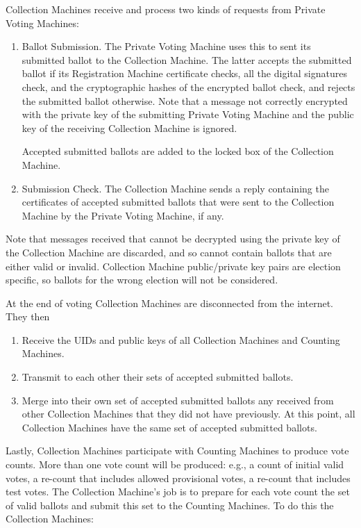 \documentclass[12pt]{article}
\begin{document}
Collection Machines receive and process two kinds of requests from
Private Voting Machines:
\begin{enumerate}

\item
Ballot Submission.  The Private Voting Machine uses this to sent
its submitted ballot to the Collection Machine.  The latter accepts
the submitted ballot if its Registration Machine certificate checks,
all the digital signatures check, and the cryptographic hashes of the
encrypted ballot check, and rejects the submitted
ballot otherwise.  Note that a message not correctly encrypted with
the private key of the submitting Private Voting Machine and the
public key of the receiving Collection Machine is ignored.

Accepted submitted ballots are added to the locked box of the
Collection Machine.

\item
Submission Check.  The Collection Machine sends a reply containing
the certificates of accepted submitted ballots
that were sent to the Collection Machine
by the Private Voting Machine, if any.

\end{enumerate}

Note that messages received that cannot be decrypted using the
private key of the Collection Machine
are discarded, and so cannot contain
ballots that are either valid or invalid.  Collection Machine
public/private key pairs are election specific, so ballots for
the wrong election will not be considered.

At the end of voting Collection Machines are disconnected from
the internet.  They then
\begin{enumerate}
\item Receive the UIDs and public keys of all Collection Machines and
Counting Machines.
\item Transmit to each other their sets of accepted submitted ballots.
\item Merge into their own set of accepted submitted ballots any
received from other Collection Machines that they did not have previously.
At this point, all Collection Machines have the same set of accepted
submitted ballots.
\setcounter{CMC-COUNTER}{\value{enumi}}
\end{enumerate}

Lastly, Collection Machines participate with Counting Machines to
produce vote counts.  More than one vote count will be produced:
e.g., a count of initial valid votes, a re-count that includes
allowed provisional votes, a re-count that includes test votes.
The Collection Machine's job is to prepare for each vote count
the set of valid ballots and submit this set to the Counting Machines.
To do this the Collection Machines:
\end{document}
